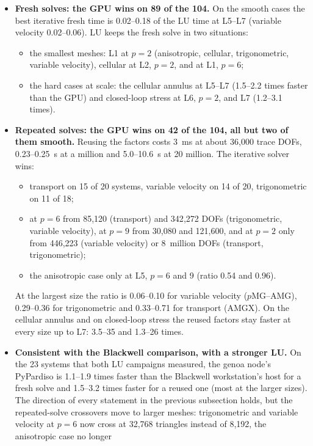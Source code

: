 \begin{itemize}
\item \textbf{Fresh solves: the GPU wins on 89 of the 104.} On the smooth cases the best iterative
  fresh time is 0.02--0.18 of the LU time at L5--L7 (variable velocity 0.02--0.06). LU keeps the
  fresh solve in two situations:
  \begin{itemize}
  \item the smallest meshes: L1 at $p=2$ (anisotropic, cellular, trigonometric, variable
    velocity), cellular at L2, $p=2$, and at L1, $p=6$;
  \item the hard cases at scale: the cellular annulus at L5--L7 (1.5--2.2 times faster than
    the GPU) and closed-loop stress at L6, $p=2$, and L7 (1.2--3.1 times).
  \end{itemize}
\item \textbf{Repeated solves: the GPU wins on 42 of the 104, all but two of them smooth.}
  Reusing the factors costs 3~ms at about 36{,}000 trace DOFs, 0.23--0.25~s at a million and
  5.0--10.6~s at 20 million. The iterative solver wins:
  \begin{itemize}
  \item transport on 15 of 20 systems, variable velocity on 14 of 20, trigonometric on 11 of 18;
  \item at $p=6$ from 85{,}120 (transport) and 342{,}272 DOFs (trigonometric, variable velocity),
    at $p=9$ from 30{,}080 and 121{,}600, and at $p=2$ only from 446{,}223 (variable velocity)
    or 8~million DOFs (transport, trigonometric);
  \item the anisotropic case only at L5, $p=6$ and 9 (ratio 0.54 and 0.96).
  \end{itemize}
  At the largest size the ratio is 0.06--0.10 for variable velocity ($p$MG--AMG), 0.29--0.36 for
  trigonometric and 0.33--0.71 for transport (AMGX). On the cellular annulus and on closed-loop
  stress the reused factors stay faster at every size up to L7: 3.5--35 and 1.3--26 times.
\item \textbf{Consistent with the Blackwell comparison, with a stronger LU.} On the 23 systems
  that both LU campaigns measured, the genoa node's PyPardiso is 1.1--1.9 times faster than the
  Blackwell workstation's host for a fresh solve and 1.5--3.2 times faster for a reused one
  (most at the larger sizes). The direction of every statement in the previous subsection holds,
  but the repeated-solve crossovers move to larger meshes: trigonometric and variable velocity at
  $p=6$ now cross at 32{,}768 triangles instead of 8{,}192, the anisotropic case no longer

\end{itemize}
